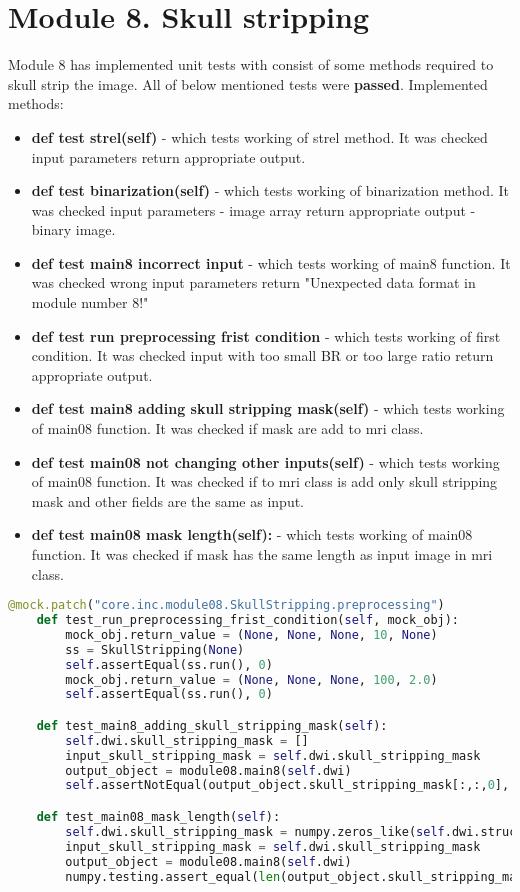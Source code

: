 \section{Module 8. Skull stripping}
Module 8 has implemented unit tests with consist of some methods required to skull strip the image. All of below mentioned tests were \textbf{passed}.
Implemented methods:
\begin{itemize}
    \item {\textbf{def test strel(self)} - which tests working of strel method. It was checked input parameters return appropriate output.}
    \item {\textbf{def test binarization(self)} - which tests working of binarization method. It was checked input parameters - image array return appropriate output - binary image.}
    \item {\textbf{def test main8 incorrect input} - which tests working of main8 function. It was checked wrong input parameters return "Unexpected data format in module number 8!"}
    \item {\textbf{def test run preprocessing frist condition} - which tests working of first condition. It was checked input with too small BR or too large ratio return appropriate output.}
    \item {\textbf{def test main8 adding skull stripping mask(self)} - which tests working of main08 function. It was checked if mask are add to mri class.}
    \item {\textbf{def test main08 not changing other inputs(self)} - which tests working of main08 function. It was checked if to mri class is add only skull stripping mask and other fields are the same as input.}
    \item {\textbf{def test main08 mask length(self):} - which tests working of main08 function. It was checked if mask has the same length as input image in mri class.}
\end{itemize}
\begin{lstlisting}[language=Python, caption = Implemented tests examples.]
    @mock.patch("core.inc.module08.SkullStripping.preprocessing")
    def test_run_preprocessing_frist_condition(self, mock_obj):
        mock_obj.return_value = (None, None, None, 10, None)
        ss = SkullStripping(None)
        self.assertEqual(ss.run(), 0)
        mock_obj.return_value = (None, None, None, 100, 2.0)
        self.assertEqual(ss.run(), 0)

    def test_main8_adding_skull_stripping_mask(self):
        self.dwi.skull_stripping_mask = []
        input_skull_stripping_mask = self.dwi.skull_stripping_mask
        output_object = module08.main8(self.dwi)
        self.assertNotEqual(output_object.skull_stripping_mask[:,:,0], input_skull_stripping_mask)

    def test_main08_mask_length(self):
        self.dwi.skull_stripping_mask = numpy.zeros_like(self.dwi.structural_data[:, :, 0])
        input_skull_stripping_mask = self.dwi.skull_stripping_mask
        output_object = module08.main8(self.dwi)
        numpy.testing.assert_equal(len(output_object.skull_stripping_mask), len(input_skull_stripping_mask))
\end{lstlisting}
